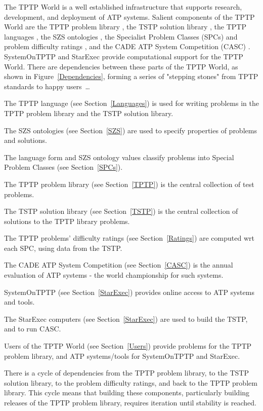 \documentclass{easychair}
\newenvironment{packed_itemize}{
\vspace*{-0.2em}
\begin{itemize}
\setlength{\partopsep}{0pt}
\setlength{\itemsep}{1pt}
\setlength{\parskip}{0pt}
\setlength{\parsep}{0pt}
}{\end{itemize}}
\begin{document}
The TPTP World \cite{Sut10,Sut17} is a well established infrastructure that supports research, 
development, and deployment of ATP systems.
Salient components of the TPTP World are
the TPTP problem library \cite{Sut09}, 
the TSTP solution library \cite{Sut10}, 
the TPTP languages \cite{SS+06}, 
the SZS ontologies \cite{Sut08-KEAPPA},
the Specialist Problem Classes (SPCs) and problem difficulty ratings \cite{SS01},
and the CADE ATP System Competition (CASC) \cite{Sut16}.
SystemOnTPTP \cite{Sut00-CADE-17} and StarExec \cite{SST14} provide computational support for
the TPTP World.
There are dependencies between these parts of the TPTP World, as shown in 
Figure~\ref{Dependencies}, forming a series of "stepping stones" from TPTP standards to 
happy users~\ldots
\begin{packed_itemize}
\item The TPTP language (see Section~\ref{Languages}) is used for writing problems in the TPTP
      problem library and the TSTP solution library.
\item The SZS ontologies (see Section~\ref{SZS}) are used to specify properties of problems
      and solutions.
\item The language form and SZS ontology values classify problems into Special Problem Classes
      (see Section~\ref{SPCs}).
\item The TPTP problem library (see Section~\ref{TPTP}) is the central collection of test problems.
\item The TSTP solution library (see Section~\ref{TSTP}) is the central collection of solutions
      to the TPTP library problems.
\item The TPTP problems' difficulty ratings (see Section~\ref{Ratings}) are computed wrt each
      SPC, using data from the TSTP.
\item The CADE ATP System Competition (see Section~\ref{CASC}) is the annual evaluation of 
      ATP systems - the world championship for such systems.
\item SystemOnTPTP (see Section~\ref{StarExec}) provides online access to ATP systems and tools.
\item The StarExec computers (see Section~\ref{StarExec}) are used to build the TSTP, and to run
      CASC.
\item Users of the TPTP World (see Section~\ref{Users}) provide problems for the TPTP problem
      library, and ATP systems/tools for SystemOnTPTP and StarExec.
\end{packed_itemize}
There is a cycle of dependencies from the TPTP problem library, to the TSTP solution 
library, to the problem difficulty ratings, and back to the TPTP problem library.
This cycle means that building these components, particularly building releases of the TPTP 
problem library, requires iteration until stability is reached.
\end{document}
